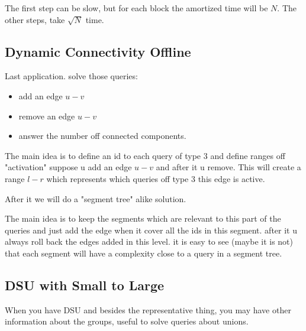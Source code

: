     The first step can be slow, but for each block the amortized time will be $N$. The other steps, take $\sqrt{N}$ time.

    

    \subsection{Dynamic Connectivity Offline}

    Last application. solve those queries:
    \begin{itemize}
        \item add an edge $u - v$
        \item remove an edge $u - v$
        \item answer the number off connected components.
    \end{itemize}

    The main idea is to define an id to each query of type $3$ and define ranges off "activation" suppose u add an edge $u - v$ and after it u remove. This will create a range $l - r$ which represents which queries off type $3$ this edge is active.

    After it we will do a "segment tree" alike solution.

    The main idea is to keep the segments which are relevant to this part of the queries and just add the edge when it cover all the ids in this segment. after it u always roll back the edges added in this level. it is easy to see (maybe it is not) that each segment will have a complexity close to a query in a segment tree.

    


    \subsection{DSU with Small to Large}

    When you have DSU and besides the representative thing, you may have other information about the groups, useful to solve queries about unions.

    
    
    

    
    
    
    